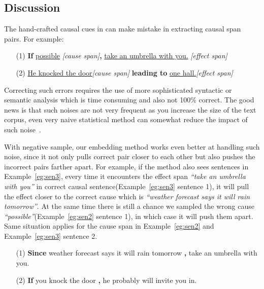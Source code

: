 \subsection{Discussion}
The hand-crafted causal cues in  can make
mistake in extracting causal span pairs. For example: 
\begin{example}
	\label{eg:sen2}
	\noindent
	\begin{itemize}
		\item[(1)] \textbf{If} \underline{possible}
{\em [cause span]}\textbf{,} \underline{take an umbrella with you.}
{\em [effect span]}
		\item[(2)] \underline{He knocked the door}{\em [cause span]} 
\textbf{leading to} \underline{one hall.}{\em [effect span]}
	\end{itemize}
\end{example}
Correcting such errors requires the use of more sophisticated syntactic or
semantic analysis which is time consuming and also not 100\% correct. 
The good news is that such noises are not very frequent as you
increase the size of the text corpus, even very naive statistical method 
can somewhat reduce the impact of such noise~\cite{luo2016commonsense}. 

With negative sample, our embedding method works even better at handling such
noise, since it not only pulls correct pair closer to each other but 
also pushes the incorrect pairs farther apart. 
For example, if the method also sees sentences in Example~\ref{eg:sen3}, 
every time it encounters the effect span \emph{``take an umbrella with you''} 
in correct causal sentence(Example~\ref{eg:sen3} sentence 1), it will pull
the effect closer to the correct cause which is 
\emph{``weather forecast says it will rain tomorrow''}.
At the same time there is still a chance we sampled the wrong cause 
\emph{``possible''}(Example~\ref{eg:sen2} sentence 1), in which case it
will push them apart. Same situation applies for the cause span in 
Example~\ref{eg:sen2} and Example~\ref{eg:sen3} sentence 2.
\begin{example}
	\label{eg:sen3}
	\noindent
	\begin{itemize}
		\item[(1)] \textbf{Since} weather forecast says it will rain tomorrow \textbf{,} take an umbrella with you.
		\item[(2)] \textbf{If} you knock the door \textbf{,} he probably will invite you in.
	\end{itemize}
\end{example}

